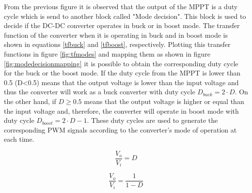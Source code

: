 From the previous figure it is observed that the output of the MPPT is a duty cycle which is send to another block called "Mode decision". This block is used to decide if the DC-DC converter operates in buck or in boost mode. The transfer function of the converter when it is operating in buck and in boost mode is shown in equations \ref{tfbuck} and \ref{tfboost}, respectively. Plotting this transfer functions in figure \ref{fig:tfmodes} and mapping them as shown in figure \ref{fig:modedecisionmapping} it is possible to obtain the corresponding duty cycle for the buck or the boost mode. If the duty cycle from the MPPT  is lower than 0.5 (D<0.5) means that the output voltage is lower than the input voltage and thus the converter will work as a buck converter with duty cycle $D_{buck}=2\cdot D$. On the other hand, if $D \geq 0.5$ means that the output voltage is higher or equal than the input voltage and, therefore, the converter will operate in boost mode with duty cycle $D_{boost}=2\cdot D - 1$. These duty cycles are used to generate the corresponding PWM signals according to the converter's mode of operation at each time. 

\vspace{1cm}
\begin{minipage}{0.3\linewidth}
	\begin{equation}
	\frac{V_o}{V_i} = D
	\end{equation}
	\label{tfbuck}
\end{minipage}%
\begin{minipage}{0.5\linewidth}
	\begin{equation}
	\frac{V_o}{V_i}= \frac{1}{1-D}
	\end{equation}
	\label{tfboost}
\end{minipage}


